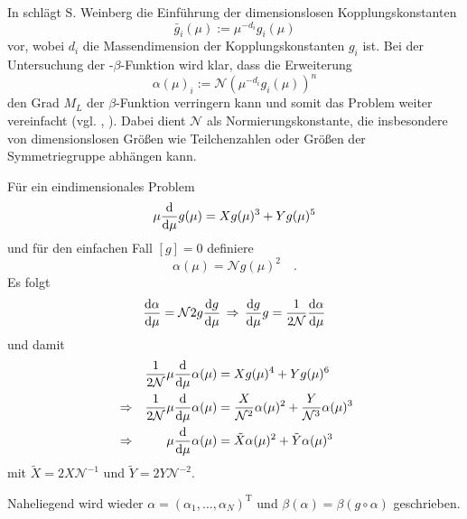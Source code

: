       In \cite{General_relativity} schlägt S. Weinberg die Einführung der dimensionslosen 
      Kopplungskonstanten
      \begin{equation}
       \bar{g}_i(\mu):= \mu^{-d_i} g_i(\mu)
      \end{equation}
      vor, wobei $d_i$ die Massendimension der Kopplungskonstanten $g_i$ ist. Bei der 
      Untersuchung der \QCDxdQCD-$\beta$-Funktion wird klar, dass die Erweiterung 
      \begin{equation}
       \alpha(\mu)_i:= \mathcal{N} \left(\mu^{-d_i} g_i(\mu)\right)^n
      \end{equation}
      den Grad $M_L$ der $\beta$-Funktion verringern kann und somit das Problem weiter 
      vereinfacht (vgl. \cite{Scale_of_dark_QCD}, \cite{Asymptotic_safety_guaranteed}). Dabei 
      dient $\mathcal{N}$ als Normierungskonstante, die insbesondere von dimensionslosen 
      Größen wie Teilchenzahlen oder Größen der Symmetriegruppe abhängen kann.
      \begin{beispiel}
	  Für ein eindimensionales Problem
	  \begin{equation}
	  \mu \frac{\text{d}}{\text{d} \mu} g(\mu) = X g(\mu)^3 + Y g(\mu)^5
	  \end{equation}
	  und für den einfachen Fall $[g]=0$ definiere 
	  \begin{equation}
	  \alpha(\mu) =\mathcal{N} g(\mu)^2 \quad .
	  \end{equation}
	  Es folgt
	\begin{equation}
	\frac{\text{d} \alpha}{\text{d} \mu}=\mathcal{N} 2 g \frac{\text{d} g}{\text{d} \mu} 
	\,\Rightarrow \, \frac{\text{d} g}{\text{d} \mu} g=\frac{1}{2\mathcal{N}} 
	\frac{\text{d} \alpha}{\text{d} \mu}
	\end{equation}
	und damit 
	 \begin{align}
	 &&\frac{1}{2\mathcal{N}} \mu \frac{\text{d}}{\text{d} \mu} \alpha(\mu) &= 
	 X g(\mu)^4 +Yg(\mu)^6 \\
	 &\Rightarrow&\frac{1}{2\mathcal{N}} \mu \frac{\text{d}}{\text{d} \mu} \alpha(\mu) &= 
	 \frac{X}{\mathcal{N}^2} \alpha(\mu)^2 + \frac{Y}{\mathcal{N}^3} \alpha(\mu)^3\\
	 &\Rightarrow& \mu \frac{\text{d}}{\text{d} \mu} \alpha(\mu) &=\tilde{X}\alpha(\mu)^2+\tilde{Y}
	 \alpha(\mu)^3 
	\end{align}
	mit $\tilde{X}=2X\mathcal{N}^{-1}$ und $\tilde{Y}=2Y\mathcal{N}^{-2}$.
    \end{beispiel}
    Naheliegend wird wieder $\alpha=(\alpha_1,\ldots,\alpha_N)^\text{T}$ und 
    $\beta(\alpha)=\beta(g\circ\alpha)$ geschrieben.
    
